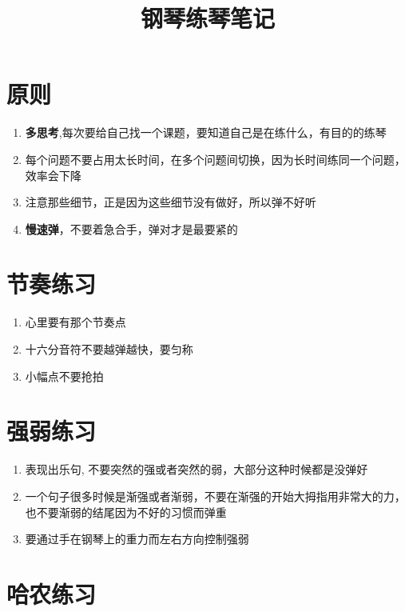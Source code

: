 \documentclass[UTF8]{ctexart}
\title{钢琴练琴笔记}
\begin{document}
\maketitle

\section{原则}

\begin{enumerate}
    \item \textbf{多思考},每次要给自己找一个课题，要知道自己是在练什么，有目的的练琴
    \item 每个问题不要占用太长时间，在多个问题间切换，因为长时间练同一个问题，效率会下降
    \item 注意那些细节，正是因为这些细节没有做好，所以弹不好听
    \item \textbf{慢速弹}，不要着急合手，弹对才是最要紧的
\end{enumerate}

\section{节奏练习}

\begin{enumerate}
    \item 心里要有那个节奏点
    \item 十六分音符不要越弹越快，要匀称 
    \item 小幅点不要抢拍 
\end{enumerate}


\section{强弱练习}

\begin{enumerate} 
    \item 表现出乐句, 不要突然的强或者突然的弱，大部分这种时候都是没弹好
    \item 一个句子很多时候是渐强或者渐弱，不要在渐强的开始大拇指用非常大的力，也不要渐弱的结尾因为不好的习惯而弹重
    \item 要通过手在钢琴上的重力而左右方向控制强弱 
\end{enumerate}



\section{哈农练习}
\end{document}
